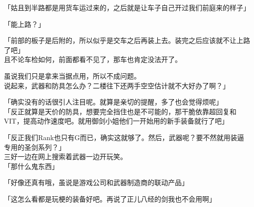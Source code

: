 「姑且到半路都是用货车运过来的，之后就是让车子自己开过我们前庭来的样子」

「能上路？」

「前部的板子是后附的，所以似乎是交车之后再装上去。装完之后应该就不让上路了吧」\\

且不论车检如何，前面都看不见了，那车也肯定没法开了。

虽说我们只是拿来当据点用，所以不成问题。\\

说起来，武器和防具怎么办？二楼往下还两手空空估计就不大好办了啊？」

「确实没有的话很引人注目呢。就算是亲切的提醒，多了也会觉得烦呢」\\

「反正就算是天价的防具，想要完全挡住也是不可能的，那干脆依靠超回复和VIT，提高动作速度吧。就用御剑小姐他们一开始用的新手装备就行了吧」

「反正我们Rank也只有G而已，确实这就够了。然后，武器呢？要不然就用装逼专用的圣剑系列？」\\

三好一边在网上搜索着武器一边开玩笑。\\

「那什么鬼东西」

「好像还真有哦，虽说是游戏公司和武器制造商的联动产品」

「这怎么看都是玩梗的装备好吧。再说了正儿八经的剑我也不会用啊」

